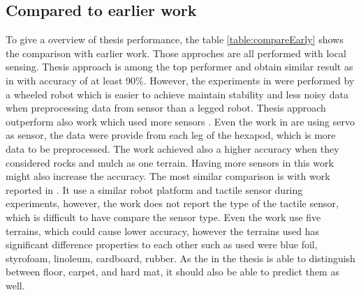 \documentclass[USenglish]{ifimaster}  %
\begin{document}
\subsection{Compared to earlier work}
To give a overview of thesis performance, the table \ref{table:compareEarly} shows the comparison with earlier work. Those approches are all performed with local sensing. Thesis approach is among the top performer and obtain similar result as in \cite{5752869,4059113,5602459,26b23e912c654fe4b7478fd910130195} with accuracy of at least 90\%. However, the experiments in \cite{5752869,4059113} were performed by a wheeled robot which is easier to achieve maintain stability and less noisy data when preprocessing data from sensor than a legged robot. Thesis approach outperform also work which used more sensors \cite{6386243}. Even the work in \cite{26b23e912c654fe4b7478fd910130195} are using servo as sensor, the data were provide from each leg of the hexapod, which is more data to be preprocessed. The work achieved also a higher accuracy when they considered rocks and mulch as one terrain. Having more sensors in this work might also increase the accuracy. The most similar comparison is with work reported in \cite{6784609}. It use a similar robot platform and tactile sensor during experiments, however, the work does not report the type of the tactile sensor, which is difficult to have compare the sensor type. Even the work use five terrains, which could cause lower accuracy, however the terrains used has significant difference properties to each other such as used were blue foil, styrofoam, linoleum, cardboard, rubber. As the in the thesis is able to distinguish between floor, carpet, and hard mat, it should also be able to predict them as well.
\end{document}
